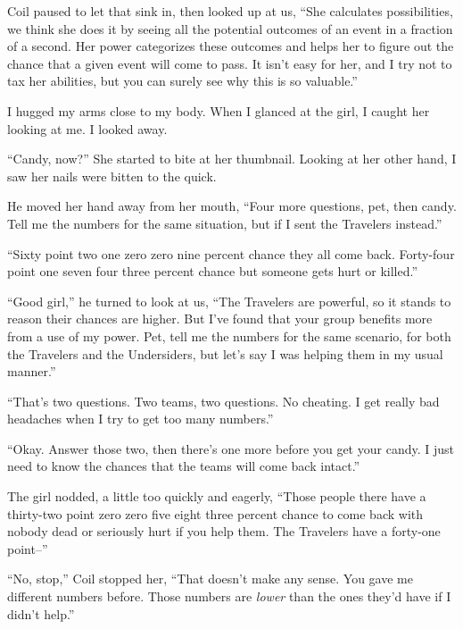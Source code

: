 Coil paused to let that sink in, then looked up at us, ``She calculates possibilities, we think she does it by seeing all the potential outcomes of an event in a fraction of a second.   Her power categorizes these outcomes and helps her to figure out the chance that a given event will come to pass.  It isn't easy for her, and I try not to tax her abilities, but you can surely see why this is so valuable.''



I hugged my arms close to my body.  When I glanced at the girl, I caught her looking at me.  I looked away.



``Candy, now?''  She started to bite at her thumbnail.  Looking at her other hand, I saw her nails were bitten to the quick.



He moved her hand away from her mouth, ``Four more questions, pet, then candy.  Tell me the numbers for the same situation, but if I sent the Travelers instead.''



``Sixty point two one zero zero nine percent chance they all come back.  Forty-four point one seven four three percent chance but someone gets hurt or killed.''



``Good girl,'' he turned to look at us, ``The Travelers are powerful, so it stands to reason their chances are higher.  But I've found that your group benefits more from a use of my power.  Pet, tell me the numbers for the same scenario, for both the Travelers and the Undersiders, but let's say I was helping them in my usual manner.''



``That's two questions.  Two teams, two questions.  No cheating.  I get really bad headaches when I try to get too many numbers.''



``Okay.  Answer those two, then there's one more before you get your candy.  I just need to know the chances that the teams will come back intact.''



The girl nodded, a little too quickly and eagerly, ``Those people there have a thirty-two point zero zero five eight three percent chance to come back with nobody dead or seriously hurt if you help them.  The Travelers have a forty-one point--''



``No, stop,'' Coil stopped her, ``That doesn't make any sense.  You gave me different numbers before.  Those numbers are \emph{lower} than the ones they'd have if I didn't help.''




